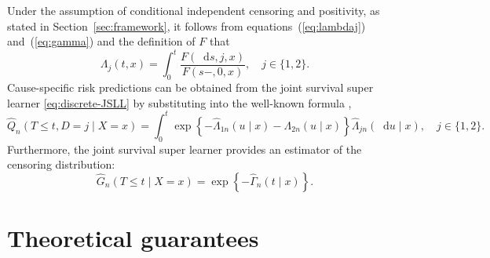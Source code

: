 \documentclass[lineno]{biometrika}
\newcommand*\diff{\mathop{}\!\mathrm{d}}
\newcommand{\1}{\mathds{1}}
\begin{document}
Under the assumption of conditional independent censoring and
positivity, as stated in Section~\ref{sec:framework}, it follows from
equations~(\ref{eq:lambdaj}) and~(\ref{eq:gamma}) and the definition
of \( F \) that
\begin{equation}
  \label{eq:7}
  \Lambda_j(t , x) 
  = \int_0^t  \frac{F(\diff s, j, x )}{F(s-, 0, x )},
  \quad j \in \{1,2\}.
\end{equation} Cause-specific risk predictions can be obtained from
the joint survival super learner \eqref{eq:discrete-JSLL} by
substituting into the well-known formula
\citep[e.g.,][]{benichou1990estimates, ozenne2017riskregression},
\begin{equation}
  \label{eq:cs-risk-def} \hat Q_n(T \leq t, D = j \mid X=x) = \int_0^t
\exp\left\{-\hat\Lambda_{1n}(u \mid x)-\Lambda_{2n}(u \mid
x)\right\} \hat\Lambda_{jn}(\diff u \mid x), \quad j \in \{1,2\}.
\end{equation} Furthermore, the joint survival super learner provides an
estimator of the censoring distribution:
\begin{equation*}
 \hat G_n(T \leq t \mid X=x) = \exp\left\{-\hat\Gamma_n(t \mid x)\right\}.
\end{equation*}



\section{Theoretical guarantees}
\label{sec:theor-results-prop}
\end{document}
